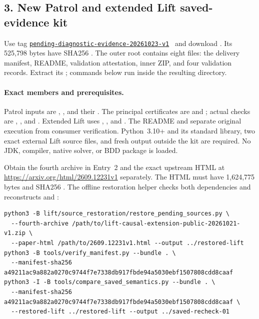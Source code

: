 \subsection*{3. New Patrol and extended Lift saved-evidence kit}
Use tag
\href{https://github.com/research-artifact-archive/seams2027/tree/pending-diagnostic-evidence-20261023-v1}{\nolinkurl{pending-diagnostic-evidence-20261023-v1}}~\cite{diagnosticartifact}
and download
.
Its 525,798 bytes have SHA256
.
The outer root  contains eight
files: the delivery manifest, README, validation attestation, inner ZIP,
and four validation records. Extract its
; commands below run inside the
resulting  directory.

\paragraph{Exact members and prerequisites.}
Patrol inputs are ,
, and their
. The principal certificates are
 and
; actual checks are
,
, and
.
Extended Lift uses ,
, and .
The README and  separate original execution from
consumer verification. Python~3.10+ and its standard library, two exact
external Lift source files, and fresh output outside the kit are required.
No JDK, compiler, native solver, or BDD package is loaded.

Obtain the fourth archive in Entry~2 and the exact upstream HTML at
\url{https://arxiv.org/html/2609.12231v1} separately. The HTML must have
1,624,775 bytes and SHA256
.
The offline restoration helper checks both dependencies and reconstructs
 and :
\noindent\begin{minipage}{\linewidth}
\begin{lstlisting}
python3 -B lift/source_restoration/restore_pending_sources.py \
  --fourth-archive /path/to/lift-causal-extension-public-20261021-v1.zip \
  --paper-html /path/to/2609.12231v1.html --output ../restored-lift
python3 -B tools/verify_manifest.py --bundle . \
  --manifest-sha256 a49211ac9a882a0270c9744f7e7338db917fbde94a5030ebf1507808cdd8caaf
python3 -I -B tools/compare_saved_semantics.py --bundle . \
  --manifest-sha256 a49211ac9a882a0270c9744f7e7338db917fbde94a5030ebf1507808cdd8caaf \
  --restored-lift ../restored-lift --output ../saved-recheck-01
\end{lstlisting}
\end{minipage}

